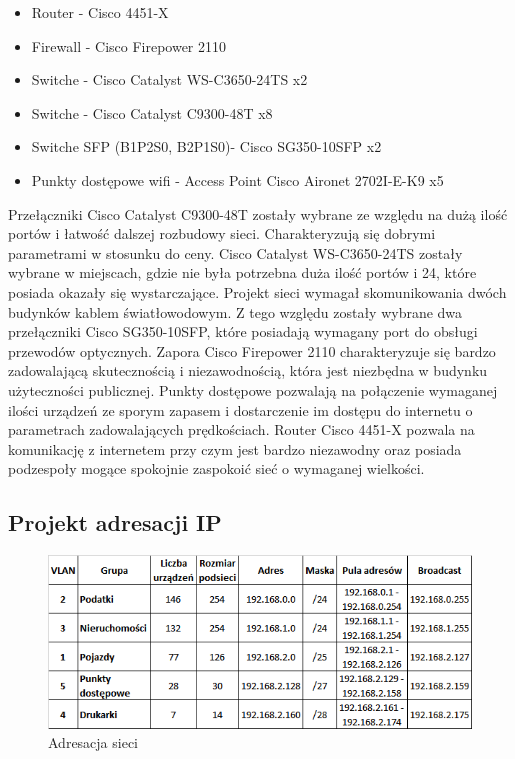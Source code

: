 \documentclass[12pt,a4paper]{article}
\begin{document}
	\begin{itemize}
		\item Router - Cisco 4451-X
		\item Firewall - Cisco Firepower 2110
		\item Switche - Cisco Catalyst WS-C3650-24TS x2
		\item Switche - Cisco Catalyst C9300-48T x8
		\item Switche SFP (B1P2S0, B2P1S0)- Cisco SG350-10SFP x2
		\item Punkty dostępowe wifi - Access Point Cisco Aironet 2702I-E-K9 x5
	\end{itemize}
		Przełączniki Cisco Catalyst C9300-48T zostały wybrane ze względu na dużą ilość portów i łatwość dalszej rozbudowy sieci. Charakteryzują się dobrymi parametrami w stosunku do ceny. Cisco Catalyst WS-C3650-24TS zostały wybrane w miejscach, gdzie nie była potrzebna duża ilość portów i 24, które posiada okazały się wystarczające. Projekt sieci wymagał skomunikowania dwóch budynków kablem światłowodowym. Z tego względu zostały wybrane dwa przełączniki Cisco SG350-10SFP, które posiadają wymagany port do obsługi przewodów optycznych. Zapora Cisco Firepower 2110 charakteryzuje się  bardzo zadowalającą skutecznością i niezawodnością, która jest niezbędna w budynku użyteczności publicznej.  Punkty dostępowe pozwalają na połączenie wymaganej ilości urządzeń ze sporym zapasem i dostarczenie im dostępu do internetu o parametrach zadowalających prędkościach. Router Cisco 4451-X pozwala na komunikację z internetem przy czym jest bardzo niezawodny oraz posiada podzespoły mogące spokojnie zaspokoić sieć o wymaganej wielkości. 

	\subsection{Projekt adresacji IP}
	
		\begin{figure}[H]
			\centering
			\includegraphics[width = \textwidth]{obrazki/vlany.png}
			\caption{Adresacja sieci}
			\label{fig:vlany}
		\end{figure}
	    
\end{document}
